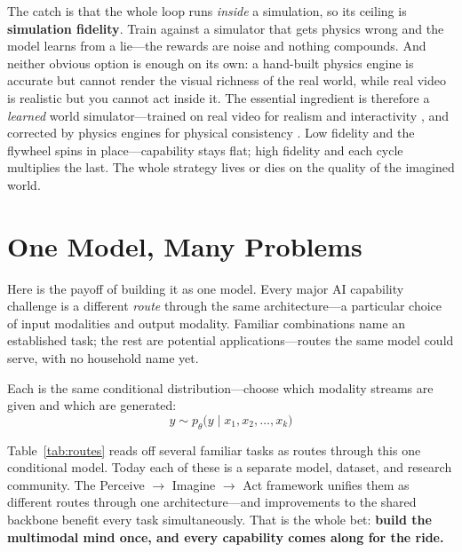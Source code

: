 \documentclass[10pt,conference]{IEEEtran}
\begin{document}
The catch is that the whole loop runs \emph{inside} a simulation, so its ceiling
is \textbf{simulation fidelity}. Train against a simulator that gets physics wrong
and the model learns from a lie---the rewards are noise and nothing compounds. And
neither obvious option is enough on its own: a hand-built physics engine is
accurate but cannot render the visual richness of the real world, while real video
is realistic but you cannot act inside it. The essential ingredient is therefore a
\emph{learned} world simulator---trained on real video for realism and
interactivity \cite{ref13}, and corrected by physics engines for physical
consistency \cite{ref20}. Low fidelity and the flywheel spins in place---capability stays flat; high fidelity and
each cycle multiplies the last. The whole strategy lives or dies on the quality of
the imagined world.

\section{One Model, Many Problems}
Here is the payoff of building it as one model. Every major AI capability
challenge is a different \emph{route} through the same architecture---a particular
choice of input modalities and output modality. Familiar combinations name an
established task; the rest are potential applications---routes the same model
could serve, with no household name yet.

Each is the same conditional distribution---choose which modality streams are
given and which are generated:
\begin{equation}
y \sim p_\theta\big(y \mid x_1, x_2, \dots, x_k\big)
\end{equation}

Table~\ref{tab:routes} reads off several familiar tasks as routes through this
one conditional model. Today each of these is a separate model, dataset, and
research community. The Perceive $\rightarrow$ Imagine $\rightarrow$ Act framework
unifies them as different routes through one architecture---and improvements to
the shared backbone benefit every task simultaneously. That is the whole bet:
\textbf{build the multimodal mind once, and every capability comes along for the
ride.}
\end{document}
